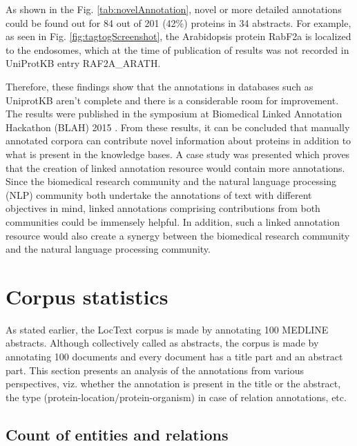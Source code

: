As shown in the Fig. \ref{tab:novelAnnotation}, novel or more detailed annotations could be found out for 84 out of 201 (42\%) proteins in 34 abstracts. For example, as seen in Fig. \ref{fig:tagtogScreenshot}, the Arabidopsis protein RabF2a is localized to the endosomes, which at the time of publication of results was not recorded in UniProtKB entry RAF2A\_ARATH.

Therefore, these findings show that the annotations in databases such as UniprotKB aren't complete and there is a considerable room for improvement. The results \cite{goldberg2015linked} were published in the symposium at Biomedical Linked Annotation Hackathon (BLAH) 2015 \cite{blah}. From these results, it can be concluded that manually annotated corpora can contribute novel information about proteins in addition to what is present in the knowledge bases. A case study was presented which proves that the creation of linked annotation resource would contain more annotations. Since the biomedical research community and the natural language processing (NLP) community both undertake the annotations of text with different objectives in mind, linked annotations comprising contributions from both communities could be immensely helpful. In addition, such a linked annotation resource would also create a synergy between the biomedical research community and the natural language processing community.


\section{Corpus statistics}\label{sec:corpusStats}


As stated earlier, the LocText corpus is made by annotating 100 MEDLINE abstracts. Although collectively called as abstracts, the corpus is made by annotating 100 documents and every document has a title part and an abstract part. This section presents an analysis of the annotations from various perspectives, viz. whether the annotation is present in the title or the abstract, the type (protein-location/protein-organism) in case of relation annotations, etc.

\subsection*{Count of entities and relations}

